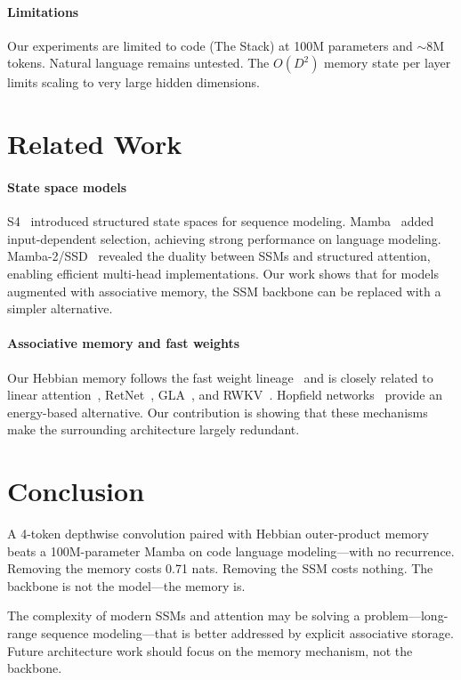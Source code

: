 \documentclass{article}
\begin{document}
\paragraph{Limitations}
Our experiments are limited to code (The Stack) at 100M parameters and $\sim$8M tokens. Natural language remains untested. The $O(D^2)$ memory state per layer limits scaling to very large hidden dimensions.

\section{Related Work}

\paragraph{State space models}
S4~\citep{gu2022efficiently} introduced structured state spaces for sequence modeling. Mamba~\citep{gu2024mamba} added input-dependent selection, achieving strong performance on language modeling. Mamba-2/SSD~\citep{dao2024mamba2} revealed the duality between SSMs and structured attention, enabling efficient multi-head implementations. Our work shows that for models augmented with associative memory, the SSM backbone can be replaced with a simpler alternative.

\paragraph{Associative memory and fast weights}
Our Hebbian memory follows the fast weight lineage~\citep{schmidhuber1992learning,ba2016using,schlag2021linear} and is closely related to linear attention~\citep{katharopoulos2020transformers}, RetNet~\citep{sun2023retentive}, GLA~\citep{yang2024gated}, and RWKV~\citep{peng2023rwkv}. Hopfield networks~\citep{hopfield1982neural,ramsauer2021hopfield} provide an energy-based alternative. Our contribution is showing that these mechanisms make the surrounding architecture largely redundant.

\section{Conclusion}

A 4-token depthwise convolution paired with Hebbian outer-product memory beats a 100M-parameter Mamba on code language modeling---with no recurrence. Removing the memory costs 0.71 nats. Removing the SSM costs nothing. The backbone is not the model---the memory is.

The complexity of modern SSMs and attention may be solving a problem---long-range sequence modeling---that is better addressed by explicit associative storage. Future architecture work should focus on the memory mechanism, not the backbone.



\end{document}
